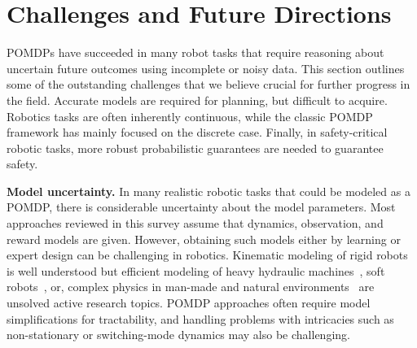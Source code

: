 \documentclass[journal]{IEEEtran}
\begin{document}
\section{Challenges and Future Directions}
\label{sec:open_questions}
POMDPs have succeeded in many robot tasks that require reasoning about uncertain future outcomes using incomplete or noisy data.
This section outlines some of the outstanding challenges that we believe crucial for further progress in the field.
Accurate models are required for planning, but difficult to acquire.
Robotics tasks are often inherently continuous, while the classic POMDP framework has mainly focused on the discrete case.
Finally, in safety-critical {robotic tasks}, more robust probabilistic guarantees are needed to guarantee safety.

%
%
%
%
%
%
%
%
%

\textbf{Model uncertainty.}
In many realistic {robotic tasks} that could be modeled as a POMDP, there is considerable uncertainty about the model parameters.
Most approaches reviewed in this survey assume that
dynamics, observation, and reward models are given. However,
obtaining such models either by learning or  expert design can be
challenging in robotics. Kinematic modeling of rigid robots is well
understood but efficient modeling of heavy hydraulic
machines~\cite{xu2016review}, soft robots~\cite{kim2021review}, or,
complex physics in man-made and natural
environments~\cite{boonvisut2012estimation} are unsolved active
research topics.
%
{POMDP approaches often require model simplifications for tractability, and handling problems with intricacies such as
non-stationary or switching-mode dynamics may also be challenging.}
\end{document}
